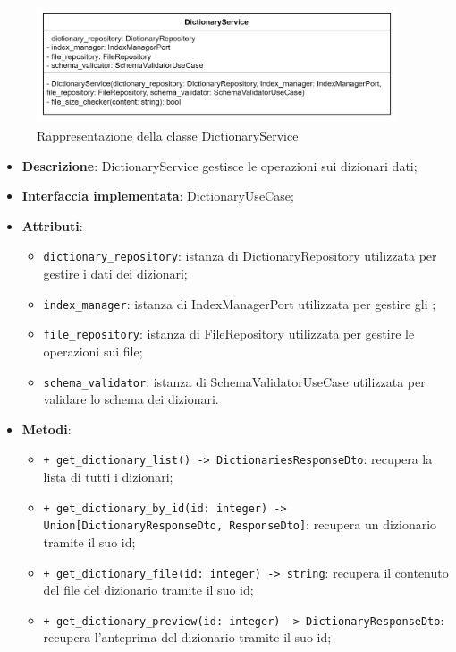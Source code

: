  \label{DictionaryService}
\begin{figure}[H]
    \centering
    \includegraphics[width=0.95\textwidth]{assets/Backend/dictionary_service.png}
    \caption{Rappresentazione della classe DictionaryService}
  \end{figure}
\begin{itemize}
    \item \textbf{Descrizione}: DictionaryService gestisce le operazioni sui dizionari dati;
    \item \textbf{Interfaccia implementata}: \hyperref[DictionaryUseCase]{DictionaryUseCase};
    \item \textbf{Attributi}:
    \begin{itemize}
        \item \texttt{dictionary\_repository}: istanza di DictionaryRepository utilizzata per gestire i dati dei dizionari;
        \item \texttt{index\_manager}: istanza di IndexManagerPort utilizzata per gestire gli ;
        \item \texttt{file\_repository}: istanza di FileRepository utilizzata per gestire le operazioni sui file;
        \item \texttt{schema\_validator}: istanza di SchemaValidatorUseCase utilizzata per validare lo schema dei dizionari.
    \end{itemize}
    \item \textbf{Metodi}:
    \begin{itemize}
        \item \texttt{+ get\_dictionary\_list() -> DictionariesResponseDto}: recupera la lista di tutti i dizionari;
        \item \texttt{+ get\_dictionary\_by\_id(id: integer) -> Union[DictionaryResponseDto, ResponseDto]}: recupera un dizionario tramite il suo id;
        \item \texttt{+ get\_dictionary\_file(id: integer) -> string}: recupera il contenuto del file del dizionario tramite il suo id;
        \item \texttt{+ get\_dictionary\_preview(id: integer) -> DictionaryResponseDto}: recupera l'anteprima del dizionario tramite il suo id;

\end{itemize}
\end{itemize}
